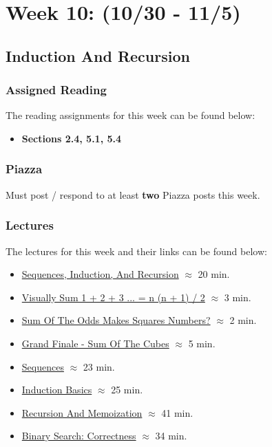\clearpage
\chapter{Week 10: (10/30 - 11/5)}

\section{Induction And Recursion}

\subsection{Assigned Reading}

The reading assignments for this week can be found below:

\begin{itemize}
    \item \textbf{Sections 2.4, 5.1, 5.4}
\end{itemize}

\subsection{Piazza}

Must post / respond to at least \textbf{two} Piazza posts this week.  

\subsection{Lectures}

The lectures for this week and their links can be found below:

\begin{itemize}
    \item \href{https://applied.cs.colorado.edu/mod/hvp/view.php?id=51758}{Sequences, Induction, And Recursion} $\approx$ 20 min.
    \item \href{https://www.youtube.com/watch?v=ktyTe2DGT2Y&t=97s}{Visually Sum 1 + 2 + 3 ... = n (n + 1) / 2} $\approx$ 3 min.
    \item \href{https://www.youtube.com/watch?v=3FemxVSgviw}{Sum Of The Odds Makes Squares Numbers?} $\approx$ 2 min.
    \item \href{https://www.youtube.com/watch?v=Knr5jmdb_Aw}{Grand Finale - Sum Of The Cubes} $\approx$ 5 min.
    \item \href{https://applied.cs.colorado.edu/mod/hvp/view.php?id=51762}{Sequences} $\approx$ 23 min.
    \item \href{https://applied.cs.colorado.edu/mod/hvp/view.php?id=51763}{Induction Basics} $\approx$ 25 min.
    \item \href{https://applied.cs.colorado.edu/mod/hvp/view.php?id=51765}{Recursion And Memoization} $\approx$ 41 min.
    \item \href{https://applied.cs.colorado.edu/mod/hvp/view.php?id=51769}{Binary Search: Correctness} $\approx$ 34 min.
\end{itemize}


